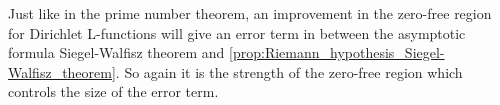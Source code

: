       Just like in the prime number theorem, an improvement in the zero-free region for Dirichlet L-functions will give an error term in between the asymptotic formula Siegel-Walfisz theorem and \cref{prop:Riemann_hypothesis_Siegel-Walfisz_theorem}. So again it is the strength of the zero-free region which controls the size of the error term.